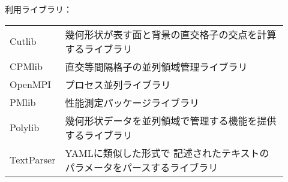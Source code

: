 \begin{description}
\item[ ] 利用ライブラリ：\\
\begin{tabular}{ll}
Cutlib & 幾何形状が表す面と背景の直交格子の交点を計算するライブラリ\\
CPMlib & 直交等間隔格子の並列領域管理ライブラリ\\
OpenMPI & プロセス並列ライブラリ\\
PMlib & 性能測定パッケージライブラリ\\
Polylib & 幾何形状データを並列領域で管理する機能を提供するライブラリ\\   
TextParser & YAMLに類似した形式で 記述されたテキストのパラメータをパースするライブラリ\\
\end{tabular}

\end{description}

